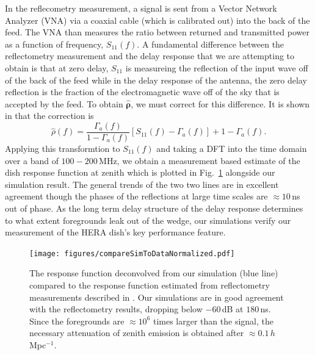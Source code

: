 \documentclass[onecolumn]{emulateapj}
\begin{document}
In the reflecometry measurement, a signal is sent from a Vector Network Analyzer (VNA) via a coaxial cable (which is calibrated out) into the back of the feed. The VNA than measures the ratio between returned and transmitted power as a function of frequency, $S_{11}(f)$. A fundamental difference between the reflectometry measurement and the delay response that we are attempting to obtain is that at zero delay, $S_{11}$ is measureing the reflection of the input wave off of the back of the feed while in the delay response of the antenna, the zero delay reflection is the fraction of the electromagnetic wave off of the sky that is accepted by the feed. To obtain $\boldsymbol{\widehat{\rho}}$, we must correct for this difference. It is shown in \citep{Patra:2015} that the correction is 
\begin{equation}
\widehat{\rho}(f) = \frac{\Gamma_a(f)}{1-\Gamma_a(f)} \left[ S_{11}(f) - \Gamma_a(f) \right] + 1 - \Gamma_a(f).
\end{equation}
Applying this transformtion to $S_{11}(f)$ and taking a DFT into the time domain over a band of $100-200$\,MHz, we obtain a measurement based estimate of the dish response function at zenith which is plotted in Fig.~\ref{fig:Comparison} alongside our simulation result. The general trends of the two two lines are in excellent agreement though the phases of the reflections at large time scales are $\approx 10$\,ns out of phase. As the long term delay structure of the delay response determines to what extent foregrounds leak out of the wedge, our simulations verify our measurement of the HERA dish's key performance feature.
\begin{figure}[h!]
\texttt{[image: figures/compareSimToDataNormalized.pdf]}
\caption{The response function deconvolved from our simulation (blue line) compared to the response function estimated from reflectometry measurements described in \citep{Patra:2015}. Our simulations are in good agreement with the reflectometry results, dropping below $-60$\,dB at $180$\,ns. Since the foregrounds are $\approx 10^6$ times larger than the signal, the necessary attenuation of zenith emission is obtained after $\approx 0.1$\,$h$Mpc$^{-1}$.}
\label{fig:Comparison}
\end{figure}
\end{document}

